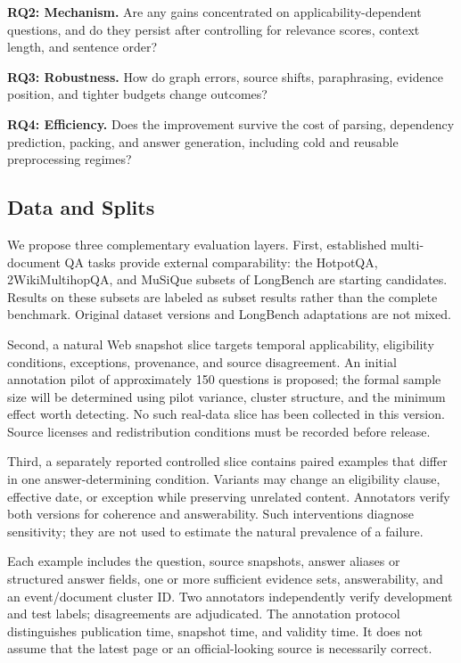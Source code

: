 \documentclass[10pt,twocolumn]{article}
\begin{document}
\textbf{RQ2: Mechanism.} Are any gains concentrated on applicability-dependent questions, and do they persist after controlling for relevance scores, context length, and sentence order?

\textbf{RQ3: Robustness.} How do graph errors, source shifts, paraphrasing, evidence position, and tighter budgets change outcomes?

\textbf{RQ4: Efficiency.} Does the improvement survive the cost of parsing, dependency prediction, packing, and answer generation, including cold and reusable preprocessing regimes?

\subsection{Data and Splits}
We propose three complementary evaluation layers. First, established multi-document QA tasks provide external comparability: the HotpotQA, 2WikiMultihopQA, and MuSiQue subsets of LongBench are starting candidates. Results on these subsets are labeled as subset results rather than the complete benchmark. Original dataset versions and LongBench adaptations are not mixed.

Second, a natural Web snapshot slice targets temporal applicability, eligibility conditions, exceptions, provenance, and source disagreement. An initial annotation pilot of approximately 150 questions is proposed; the formal sample size will be determined using pilot variance, cluster structure, and the minimum effect worth detecting. No such real-data slice has been collected in this version. Source licenses and redistribution conditions must be recorded before release.

Third, a separately reported controlled slice contains paired examples that differ in one answer-determining condition. Variants may change an eligibility clause, effective date, or exception while preserving unrelated content. Annotators verify both versions for coherence and answerability. Such interventions diagnose sensitivity; they are not used to estimate the natural prevalence of a failure.

Each example includes the question, source snapshots, answer aliases or structured answer fields, one or more sufficient evidence sets, answerability, and an event/document cluster ID. Two annotators independently verify development and test labels; disagreements are adjudicated. The annotation protocol distinguishes publication time, snapshot time, and validity time. It does not assume that the latest page or an official-looking source is necessarily correct.
\end{document}
